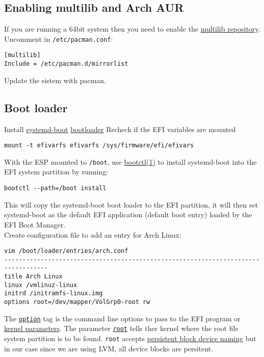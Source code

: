 \documentclass[12pt,A4]{article}
\begin{document}
\subsection{Enabling multilib and Arch AUR}
If you are running a 64bit system then you need to enable the \href{https://wiki.archlinux.org/index.php/Official_repositories#multilib}{multilib repository}.\\
Uncomment in \texttt{/etc/pacman.conf}: 
\begin{verbatim}
[multilib]
Include = /etc/pacman.d/mirrorlist
\end{verbatim}
Update the sistem with pacman.

\subsection{Boot loader}
Install \href{https://wiki.archlinux.org/index.php/Systemd-boot}{systemd-boot} \href{https://wiki.archlinux.org/index.php/Boot_loader}{bootloader}
Recheck if the EFI variables are mounted
\begin{verbatim}
mount -t efivarfs efivarfs /sys/firmware/efi/efivars
\end{verbatim}
With the ESP mounted to \texttt{/boot}, use \href{https://jlk.fjfi.cvut.cz/arch/manpages/man/bootctl.1}{bootctl(1)} to install systemd-boot into the EFI system partition by running:
\begin{verbatim}
bootctl --path=/boot install
\end{verbatim}
This will copy the systemd-boot boot loader to the EFI partition, it will then set systemd-boot as the default EFI application (default boot entry) loaded by the EFI Boot Manager.\\
Create configuration file to add an entry for Arch Linux:
\begin{verbatim}
vim /boot/loader/entries/arch.conf
----------------------------------------------------------------------------------
title Arch Linux
linux /vmlinuz-linux
initrd /initramfs-linux.img
options root=/dev/mapper/VolGrp0-root rw
\end{verbatim}
The \href{https://wiki.archlinux.org/index.php/Systemd-boot#Adding_loaders}{\texttt{option}} tag  is the command line options to pass to the EFI program or \href{https://wiki.archlinux.org/index.php/Kernel_parameters}{kernel parameters}. The parameter \href{https://wiki.archlinux.org/index.php/Kernel_parameters#Parameter_list}{\texttt{root}} tells ther kernel where the root file system partition is to be found. \texttt{root} accepts \href{https://wiki.archlinux.org/index.php/Persistent_block_device_naming}{persistent block device naming} but in our case since we are using LVM, all device blocks are persitent.
\end{document}
